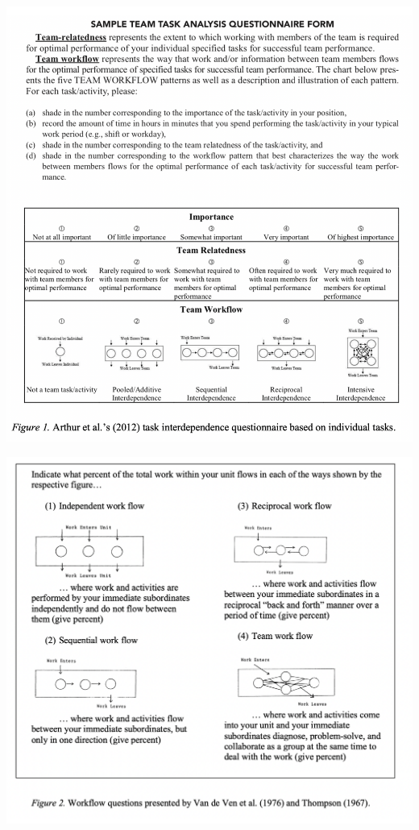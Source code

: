 \documentclass[english,,man]{apa6}
\theoremstyle{definition}
\theoremstyle{definition}
\theoremstyle{definition}
\theoremstyle{remark}
\begin{document}
\includegraphics{images/figure1.png}

\includegraphics{images/figure2.png}
\end{document}
